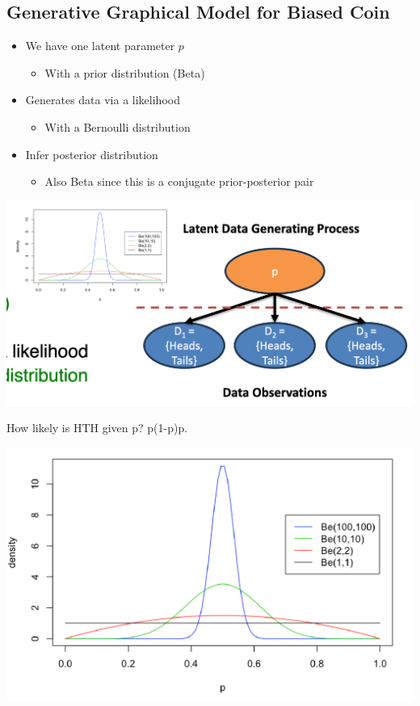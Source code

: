 \documentclass[11pt]{article}
\theoremstyle{definition}
\begin{document}
\subsection{Generative Graphical Model for Biased Coin}

\begin{itemize}
    \item We have one latent parameter \( p \)
    \begin{itemize}
        \item With a prior distribution (Beta)
    \end{itemize}
    \item Generates data via a likelihood
    \begin{itemize}
        \item With a Bernoulli distribution
    \end{itemize}
    \item Infer posterior distribution
    \begin{itemize}
        \item Also Beta since this is a conjugate prior-posterior pair
    \end{itemize}
\end{itemize}

\includegraphics[width=\textwidth/2]{9.png}

How likely is HTH given p? p(1-p)p.



\includegraphics[width=\textwidth/2]{5.png}
\end{document}
